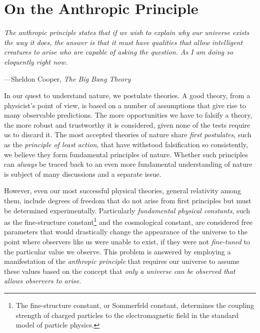 \cleardoublepage
\chapter{On the Anthropic Principle}\label{app:anthropic}

\epigraph{\itshape The anthropic principle states that if we wish to explain why our universe exists the way it does, the answer is that it must have qualities that allow intelligent creatures to arise who are capable of asking the question. As I am doing so eloquently right now.}{---Sheldon Cooper, \textit{The Big Bang Theory}\footnotemark}

In our quest to understand nature, we postulate theories. A good theory, from a physicist's point of view, is based on a number of assumptions that give rise to many observable predictions. The more opportunities we have to falsify a theory, the more robust and trustworthy it is considered, given none of the tests require us to discard it. The most accepted theories of nature share \emph{first postulates}, such as the \emph{principle of least action}, that have withstood falsification so consistently, we believe they form fundamental principles of nature. Whether such principles can \emph{always} be traced back to an even more fundamental understanding of nature is subject of many discussions and a separate issue.

However, even our most successful physical theories, general relativity among them, include degrees of freedom that do not arise from first principles but must be determined experimentally. Particularly \emph{fundamental physical constants}, such as the fine-structure constant\footnote{The fine-structure constant, or Sommerfeld constant, determines the coupling strength of charged particles to the electromagnetic field in the standard model of particle physics.} and the cosmological constant, are considered free parameters that would drastically change the appearance of the universe to the point where observers like us were unable to exist, if they were not \emph{fine-tuned} to the particular value we observe. This problem is answered by employing a manifestation of the \emph{anthropic principle} that requires our universe to assume these values based on the concept that \emph{only a universe can be observed that allows observers to arise}.

